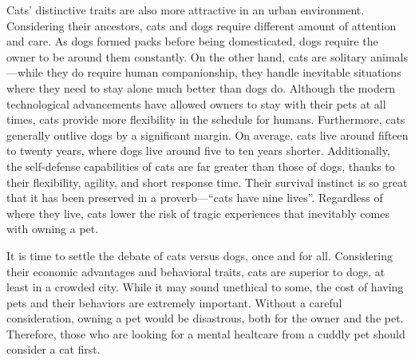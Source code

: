\documentclass{mla}
\begin{document}
\color{green}
Cats' distinctive traits are also more attractive in an urban environment.
\color{blue}
Considering their ancestors, cats and dogs require different amount of attention and care.
As dogs formed packs before being domesticated, dogs require the owner to be around them constantly.
On the other hand, cats are solitary animals---while they do require human companionship, they handle inevitable situations where they need to stay alone much better than dogs do.
Although the modern technological advancements have allowed owners to stay with their pets at all times, cats provide more flexibility in the schedule for humans.
Furthermore, cats generally outlive dogs by a significant margin.
On average, cats live around fifteen to twenty years, where dogs live around five to ten years shorter.
Additionally, the self-defense capabilities of cats are far greater than those of dogs, thanks to their flexibility, agility, and short response time.
Their survival instinct is so great that it has been preserved in a proverb---``cats have nine lives''.
Regardless of where they live, cats lower the risk of tragic experiences that inevitably comes with owning a pet.

\color{black}
It is time to settle the debate of cats versus dogs, once and for all.
Considering their economic advantages and behavioral traits, cats are superior to dogs, at least in a crowded city.
While it may sound unethical to some, the cost of having pets and their behaviors are extremely important.
Without a careful consideration, owning a pet would be disastrous, both for the owner and the pet.
Therefore, those who are looking for a mental healtcare from a cuddly pet should consider a cat first.
\end{document}

